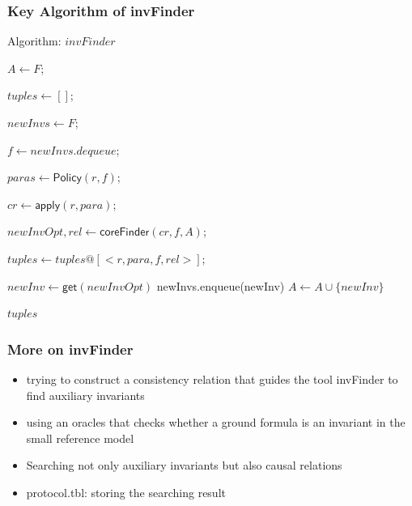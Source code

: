 \documentclass{beamer}
\begin{document}
\begin{frame}\frametitle{Key Algorithm of {\sf invFinder}}

\begin{algorithm}\label{alg:invFinder}

\caption{Algorithm: $invFinder$}\label{alg:invfinder}



{
    $A\leftarrow F$;

    $tuples \leftarrow []$;

    $newInvs \leftarrow F$;

    {
   $ f \leftarrow newInvs.dequeue$;

   { $paras \leftarrow \mathsf{Policy}(r,f)$;

     {$cr \leftarrow \mathsf{apply}(r,para)$;

       $newInvOpt,rel \leftarrow \mathsf{coreFinder}(cr,  f, A)$;

        $tuples \leftarrow tuples @[<r, para, f, rel>]$;

        {$newInv \leftarrow \mathsf{get}(newInvOpt)$\;
         newInvs.enqueue(newInv)\;
        $A \leftarrow A \cup \{newInv\}$\;
        }

     }
   }
  }
\Return $tuples$\;
}


\end{algorithm}
 \end{frame}


\begin{frame}\frametitle{More on {\sf invFinder}}


\begin{itemize}
\item trying to construct a consistency relation that
guides the tool {\sf invFinder} to find auxiliary invariants

\item using an oracles that checks whether a ground
formula is an invariant in the small reference model


\item Searching not only auxiliary invariants but also causal relations

\item   protocol.tbl:  storing the searching result
\end{itemize}
 \end{frame}
\end{document}
